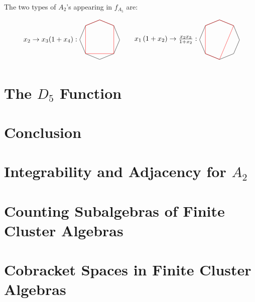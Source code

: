 \documentclass[11pt]{article}
\def\pdfeq#1{\texorpdfstring{$#1$}{a}}
\def\drawOctagon{
\coordinate (P1) at (45:1);
\coordinate (P2) at (90:1);
\coordinate (P3) at (135:1);
\coordinate (P4) at (180:1);
\coordinate (P5) at (225:1);
\coordinate (P6) at (270:1);
\coordinate (P7) at (315:1);
\coordinate (P8) at (359:1);
\draw (P1) -- (P2) -- (P3) -- (P4) -- (P5) -- (P6) -- (P7) -- (P8) -- cycle;
}
\begin{document}
The two types of $A_2$'s appearing in $f_{A_5}$ are:

\begin{equation}
\begin{tikzpicture}
\drawOctagon
\draw[color=red] (P1) -- (P2) -- (P3) -- (P5) -- (P7) -- cycle;
\node[anchor=east] at (-1,0) (a) {$x_2 \to x_3(1+x_4):$};
\begin{scope}[xshift=6cm]
\drawOctagon
\node[anchor=east] at (-1,0) (a) {$x_1 \left(1+x_2\right)\to \frac{x_2x_3}{1+x_2}:$};
\draw[color=red] (P1) -- (P2) -- (P3) -- (P5) -- (P6) -- cycle;
\end{scope}
\end{tikzpicture}
\end{equation}

\section{The \pdfeq{D_5} Function}


\section{Conclusion}

\appendix

\section{Integrability and Adjacency for \pdfeq{A_2}}

\section{Counting Subalgebras of Finite Cluster Algebras}

\section{Cobracket Spaces in Finite Cluster Algebras}




\end{document}
